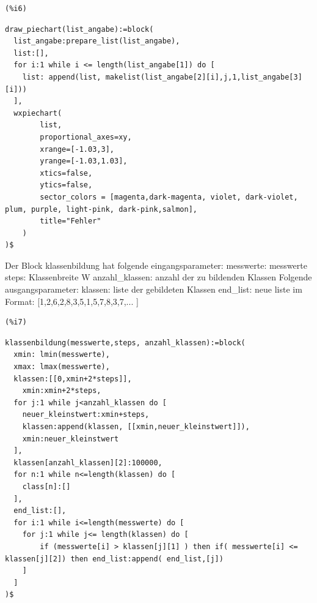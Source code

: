 \documentclass[12pt]{article}
\begin{document}
\noindent
\begin{minipage}[t]{8ex}{\color{red}\bf
\begin{verbatim}
(%i6) 
\end{verbatim}}
\end{minipage}
\begin{minipage}[t]{\textwidth}{\color{blue}
\begin{verbatim}
draw_piechart(list_angabe):=block(
  list_angabe:prepare_list(list_angabe),
  list:[],
  for i:1 while i <= length(list_angabe[1]) do [
    list: append(list, makelist(list_angabe[2][i],j,1,list_angabe[3][i]))
  ],
  wxpiechart(
        list,
        proportional_axes=xy,
        xrange=[-1.03,3], 
        yrange=[-1.03,1.03],
        xtics=false,
        ytics=false,
        sector_colors = [magenta,dark-magenta, violet, dark-violet, plum, purple, light-pink, dark-pink,salmon],
        title="Fehler"
    )
)$
\end{verbatim}}
\end{minipage}

Der Block klassenbildung hat folgende eingangsparameter:
    messwerte: messwerte
    steps: Klassenbreite W
    anzahl\_klassen: anzahl der zu bildenden Klassen
Folgende ausgangsparameter:
    klassen: liste der gebildeten Klassen
    end\_list: neue liste im Format: [1,2,6,2,8,3,5,1,5,7,8,3,7,... ]

\noindent
\begin{minipage}[t]{8ex}{\color{red}\bf
\begin{verbatim}
(%i7) 
\end{verbatim}}
\end{minipage}
\begin{minipage}[t]{\textwidth}{\color{blue}
\begin{verbatim}
klassenbildung(messwerte,steps, anzahl_klassen):=block(
  xmin: lmin(messwerte),
  xmax: lmax(messwerte),
  klassen:[[0,xmin+2*steps]],
    xmin:xmin+2*steps,
  for j:1 while j<anzahl_klassen do [
    neuer_kleinstwert:xmin+steps,
    klassen:append(klassen, [[xmin,neuer_kleinstwert]]),
    xmin:neuer_kleinstwert
  ],
  klassen[anzahl_klassen][2]:100000,  
  for n:1 while n<=length(klassen) do [
    class[n]:[]
  ],
  end_list:[],
  for i:1 while i<=length(messwerte) do [ 
    for j:1 while j<= length(klassen) do [
        if (messwerte[i] > klassen[j][1] ) then if( messwerte[i] <= klassen[j][2]) then end_list:append( end_list,[j])
    ]
  ]
)$
\end{verbatim}}
\end{minipage}
\end{document}
